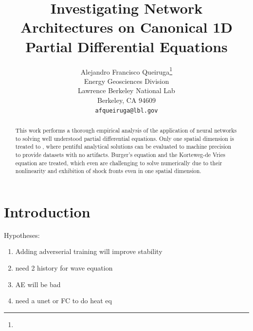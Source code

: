\documentclass{article}
\title{Investigating Network Architectures on Canonical 1D Partial Differential Equations}
\author{%
  Alejandro Francisco Queiruga\thanks{} \\
  Energy Geosciences Division\\
  Lawrence Berkeley National Lab\\
  Berkeley, CA 94609\\
  \texttt{afqueiruga@lbl.gov} \\
}
\begin{document}
\maketitle

\begin{abstract}
  This work performs a thorough empirical analysis of the application
  of neural networks to solving well understood partial differential
  equations. Only one spatial dimension is treated to , where pentiful analytical solutions can be evaluated to machine precision to provide datasets with no artifacts.
  Burger's equation and the Korteweg-de Vries equation are treated,
  which even are challenging to solve numerically due
  to their nonlinearity and exhibition of shock fronts even in one spatial dimension.
\end{abstract}

\section{Introduction}

Hypotheses:
\begin{enumerate}
  \item Adding adverserial training will improve stability
  \item need 2 history for wave equation
  \item AE will be bad
    \item need a unet or FC to do heat eq
\end{enumerate}
\end{document}
